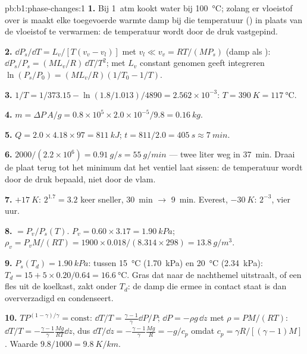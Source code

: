 \begin{solution}{pb:b1:phase-changes:1}
\textbf{1.} Bij \qty{1}{atm} kookt water bij \qty{100}{\degreeCelsius}; zolang er
vloeistof over is maakt elke toegevoerde warmte damp bij die temperatuur
() in plaats van de vloeistof te verwarmen: de temperatuur wordt
door de druk vastgepind.

\textbf{2.} $\dd P_s/\dd T = L_v/[T(v_v - v_l)]$ met $v_l \ll v_v = RT/(MP_s)$
(damp als ): $\dd P_s/P_s = (ML_v/R)\,\dd T/T^2$; met $L_v$ constant
genomen geeft integreren $\ln(P_s/P_0) = (ML_v/R)(1/T_0 - 1/T)$.

\textbf{3.} $1/T = 1/373.15 - \ln(1.8/1.013)/4890 = 2.562 \times 10^{-3}$: $T =
\qty{390}{K} = \qty{117}{\degreeCelsius}$.

\textbf{4.} $m = \Delta P\,A/g = 0.8 \times 10^5 \times 2.0 \times 10^{-5}/9.8 =
\qty{0.16}{kg}$.

\textbf{5.} $Q = 2.0 \times 4.18 \times 97 = \qty{811}{kJ}$; $t = 811/2.0 =
\qty{405}{s} \approx \qty{7}{min}$.

\textbf{6.} $2000/(2.2 \times 10^6) = \qty{0.91}{g/s} = \qty{55}{g/min}$ --- twee
liter weg in \qty{37}{min}. Draai de plaat terug tot het minimum dat
het ventiel laat sissen: de temperatuur wordt door de druk bepaald, niet door
de vlam.

\textbf{7.} $+\qty{17}{K}$: $2^{1.7} = 3.2$ keer sneller, \qty{30}{min}
$\to$ \qty{9}{min}. Everest, $-\qty{30}{K}$: $2^{-3}$, vier uur.

\textbf{8.}  $= P_v/P_s(T)$. $P_v = 0.60 \times 3.17 =
\qty{1.90}{kPa}$; $\rho_v = P_vM/(RT) = 1900 \times 0.018/(8.314 \times 298) =
\qty{13.8}{g/m^3}$.

\textbf{9.} $P_s(T_d) = \qty{1.90}{kPa}$: tussen \qty{15}{\degreeCelsius}
(\qty{1.70}{kPa}) en \qty{20}{\degreeCelsius} (\qty{2.34}{kPa}): $T_d = 15 + 5 \times 0.20/0.64
= \qty{16.6}{\degreeCelsius}$. Gras dat naar de nachthemel uitstraalt, of een
fles uit de koelkast, zakt onder $T_d$: de damp die ermee in contact
staat is dan oververzadigd en condenseert.

\textbf{10.} $TP^{(1-\gamma)/\gamma} = \text{const}$: $\dd T/T = \frac{\gamma - 1}{\gamma}
\dd P/P$; $\dd P = -\rho g\,\dd z$ met $\rho = PM/(RT)$: $\dd T/T = -\frac{\gamma -
1}{\gamma}\frac{Mg}{RT}\dd z$, dus $\dd T/\dd z = -\frac{\gamma - 1}{\gamma}\frac{Mg}{R} =
-g/c_p$ omdat $c_p = \gamma R/[(\gamma - 1)M]$. Waarde $9.8/1000 = \qty{9.8}{K/km}$.


\end{solution}
